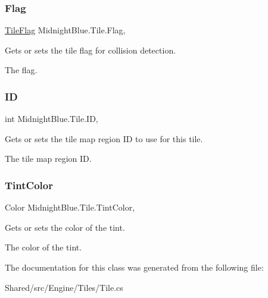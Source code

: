 \subsubsection{\texorpdfstring{Flag}{Flag}}
{\footnotesize\ttfamily \hyperlink{namespace_midnight_blue_ad3f455dc6bab1e76768d1a468ae3e33b}{Tile\+Flag} Midnight\+Blue.\+Tile.\+Flag\hspace{0.3cm}{\ttfamily [get]}, {\ttfamily [set]}}



Gets or sets the tile flag for collision detection. 

The flag.\hypertarget{class_midnight_blue_1_1_tile_a67011be5ab290007a4a45c4b6b0d24f0}{}\label{class_midnight_blue_1_1_tile_a67011be5ab290007a4a45c4b6b0d24f0} 
\subsubsection{\texorpdfstring{ID}{ID}}
{\footnotesize\ttfamily int Midnight\+Blue.\+Tile.\+ID\hspace{0.3cm}{\ttfamily [get]}, {}}



Gets or sets the tile map region ID to use for this tile. 

The tile map region ID.\hypertarget{class_midnight_blue_1_1_tile_a01da016ec2ef47b50e6bac7e01ae031b}{}\label{class_midnight_blue_1_1_tile_a01da016ec2ef47b50e6bac7e01ae031b} 
\subsubsection{\texorpdfstring{Tint\+Color}{TintColor}}
{\footnotesize\ttfamily Color Midnight\+Blue.\+Tile.\+Tint\+Color\hspace{0.3cm}{\ttfamily [get]}, {}}



Gets or sets the color of the tint. 

The color of the tint.

The documentation for this class was generated from the following file\+:\begin{DoxyCompactItemize}
\item 
Shared/src/\+Engine/\+Tiles/Tile.\+cs\end{DoxyCompactItemize}
